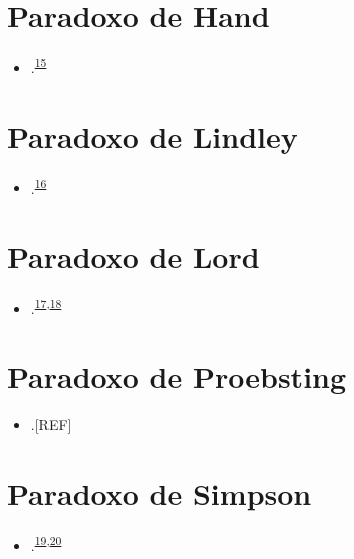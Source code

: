 \documentclass[
  a4paper,
]{book}
\providecommand{\tightlist}{%
  \setlength{\itemsep}{0pt}\setlength{\parskip}{0pt}}
\begin{document}
\hypertarget{hand}{%
\section{Paradoxo de Hand}\label{hand}}

\begin{itemize}
\tightlist
\item
  .\textsuperscript{\protect\hyperlink{ref-hand1992}{15}}
\end{itemize}

\hypertarget{lindley}{%
\section{Paradoxo de Lindley}\label{lindley}}

\begin{itemize}
\tightlist
\item
  .\textsuperscript{\protect\hyperlink{ref-lindley1957}{16}}
\end{itemize}

\hypertarget{lord}{%
\section{Paradoxo de Lord}\label{lord}}

\begin{itemize}
\tightlist
\item
  .\textsuperscript{\protect\hyperlink{ref-lord1967}{17},\protect\hyperlink{ref-lord1969}{18}}
\end{itemize}

\hypertarget{proebsting}{%
\section{Paradoxo de Proebsting}\label{proebsting}}

\begin{itemize}
\tightlist
\item
  .{[}REF{]}
\end{itemize}

\hypertarget{simpson}{%
\section{Paradoxo de Simpson}\label{simpson}}

\begin{itemize}
\tightlist
\item
  .\textsuperscript{\protect\hyperlink{ref-simpson1951}{19},\protect\hyperlink{ref-blyth1972}{20}}
\end{itemize}
\end{document}
